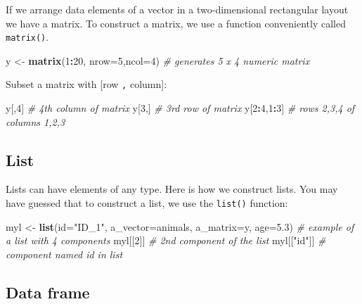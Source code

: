 \documentclass[]{book}
\newenvironment{Shaded}{\begin{snugshade}}{\end{snugshade}}
\newcommand{\KeywordTok}[1]{\textcolor[rgb]{0.13,0.29,0.53}{\textbf{#1}}}
\newcommand{\DataTypeTok}[1]{\textcolor[rgb]{0.13,0.29,0.53}{#1}}
\newcommand{\DecValTok}[1]{\textcolor[rgb]{0.00,0.00,0.81}{#1}}
\newcommand{\FloatTok}[1]{\textcolor[rgb]{0.00,0.00,0.81}{#1}}
\newcommand{\StringTok}[1]{\textcolor[rgb]{0.31,0.60,0.02}{#1}}
\newcommand{\CommentTok}[1]{\textcolor[rgb]{0.56,0.35,0.01}{\textit{#1}}}
\newcommand{\OperatorTok}[1]{\textcolor[rgb]{0.81,0.36,0.00}{\textbf{#1}}}
\newcommand{\NormalTok}[1]{#1}
\theoremstyle{definition}
\theoremstyle{definition}
\theoremstyle{remark}
\begin{document}
If we arrange data elements of a vector in a two-dimensional rectangular
layout we have a matrix. To construct a matrix, we use a function
conveniently called \texttt{matrix()}.

\begin{Shaded}
\begin{Highlighting}[]
\NormalTok{y <-}\StringTok{ }\KeywordTok{matrix}\NormalTok{(}\DecValTok{1}\OperatorTok{:}\DecValTok{20}\NormalTok{, }\DataTypeTok{nrow=}\DecValTok{5}\NormalTok{,}\DataTypeTok{ncol=}\DecValTok{4}\NormalTok{) }\CommentTok{# generates 5 x 4 numeric matrix}
\end{Highlighting}
\end{Shaded}

Subset a matrix with {[}row \texttt{,} column{]}:

\begin{Shaded}
\begin{Highlighting}[]
\NormalTok{y[,}\DecValTok{4}\NormalTok{]       }\CommentTok{# 4th column of matrix}
\NormalTok{y[}\DecValTok{3}\NormalTok{,]       }\CommentTok{# 3rd row of matrix}
\NormalTok{y[}\DecValTok{2}\OperatorTok{:}\DecValTok{4}\NormalTok{,}\DecValTok{1}\OperatorTok{:}\DecValTok{3}\NormalTok{]  }\CommentTok{# rows 2,3,4 of columns 1,2,3}
\end{Highlighting}
\end{Shaded}

\subsection{List}\label{list}

Lists can have elements of any type. Here is how we construct lists. You
may have guessed that to construct a list, we use the \texttt{list()}
function:

\begin{Shaded}
\begin{Highlighting}[]
\NormalTok{myl <-}\StringTok{ }\KeywordTok{list}\NormalTok{(}\DataTypeTok{id=}\StringTok{"ID_1"}\NormalTok{, }\DataTypeTok{a_vector=}\NormalTok{animals, }\DataTypeTok{a_matrix=}\NormalTok{y, }\DataTypeTok{age=}\FloatTok{5.3}\NormalTok{) }\CommentTok{# example of a list with 4 components}
\NormalTok{myl[[}\DecValTok{2}\NormalTok{]] }\CommentTok{# 2nd component of the list}
\NormalTok{myl[[}\StringTok{"id"}\NormalTok{]] }\CommentTok{# component named id in list}
\end{Highlighting}
\end{Shaded}

\subsection{Data frame}\label{data-frame}
\end{document}

